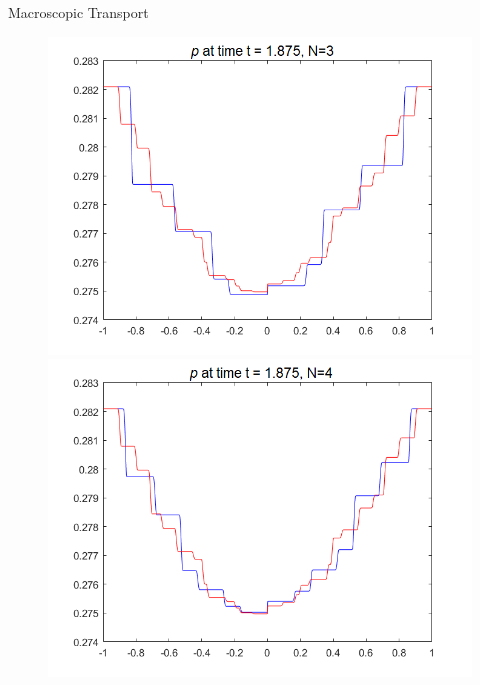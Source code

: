 \begin{frame}{Macroscopic Transport}
\begin{figure}[H]
		\hfill
		\begin{minipage}{0.32\textwidth}
			\includegraphics[width=\textwidth]{Bilder_wx/Wavepropa/red=12th_blue=6th_wx=1_leftDr1_rightDr2_Awp12th}
		\end{minipage}
		\vfill
		\begin{minipage}{0.32\textwidth}
			\includegraphics[width=\textwidth]{Bilder_wx/Wavepropa/red=12th_blue=8th_wx=1_leftDr1_rightDr2_Awp12th}
		\end{minipage}
		\hfill
		\begin{minipage}{0.32\textwidth}

\end{minipage}
\end{figure}
\end{frame}
